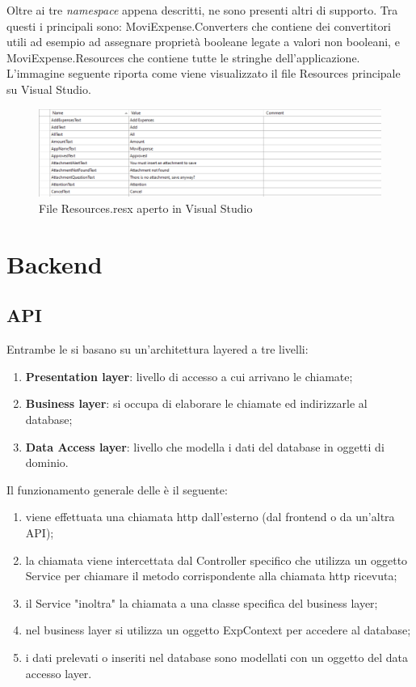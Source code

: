\vspace{1.5cm}

\noindent Oltre ai tre \emph{namespace} appena descritti, ne sono presenti altri di supporto. Tra questi i principali sono: MoviExpense.Converters che contiene dei convertitori utili ad esempio ad assegnare proprietà booleane legate a valori non booleani, e MoviExpense.Resources che contiene tutte le stringhe dell'applicazione. L'immagine seguente riporta come viene visualizzato il file Resources principale su Visual Studio.

\begin{figure}[H]
    \centering
    \includegraphics[width=\columnwidth]{images/resources.png}
    \caption{File Resources.resx aperto in Visual Studio}
\end{figure}



\section{Backend}

\subsection{API}

Entrambe le  si basano su un'architettura layered a tre livelli:
\begin{enumerate}
    \item \textbf{Presentation layer}: livello di accesso a cui arrivano le chiamate;
    \item \textbf{Business layer}: si occupa di elaborare le chiamate ed indirizzarle al database;
    \item \textbf{Data Access layer}: livello che modella i dati del database in oggetti di dominio.
\end{enumerate}

\noindent Il funzionamento generale delle  è il seguente:
\begin{enumerate}
    \item viene effettuata una chiamata http dall'esterno (dal frontend o da un'altra API);
    \item la chiamata viene intercettata dal Controller specifico che utilizza un oggetto Service per chiamare il metodo corrispondente alla chiamata http ricevuta;
    \item il Service "inoltra" la chiamata a una classe specifica del business layer;
    \item nel business layer si utilizza un oggetto ExpContext per accedere al database;
    \item i dati prelevati o inseriti nel database sono modellati con un oggetto del data accesso layer.
\end{enumerate}

